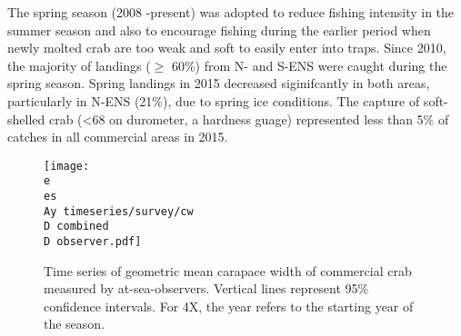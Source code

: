 \documentclass[paper=a4, fontsize=11pt]{article}
\newcommand{\D}{.}
\newcommand{\e}{/home/michelle/ecomod_data/}
\newcommand{\es}{snowcrab/}
\newcommand{\Ay}{assessments/2015/}
\begin{document}
The spring season (2008 -present) was adopted to reduce fishing intensity in the summer season and also to encourage fishing during the earlier period when newly molted crab are too weak and soft to easily enter into traps. Since 2010, the majority of landings ($\geq$ 60\%) from N- and S-ENS were caught during the spring season. Spring landings in 2015 decreased siginifcantly in both areas, particularly in N-ENS (21\%), due to spring ice conditions. The capture of soft-shelled crab (<68 on durometer, a hardness guage) represented less than 5\% of catches in all commercial areas in 2015.\\

\begin{figure}[h]
    \centering
    \texttt{[image: \\e \\es \\Ay timeseries/survey/cw\\D combined\\D observer.pdf]}
    \caption{Time series of geometric mean carapace width of commercial crab measured by at-sea-observers. Vertical lines represent 95\% confidence intervals. For 4X, the year refers to the starting year of the season.}
\end{figure}
\end{document}
